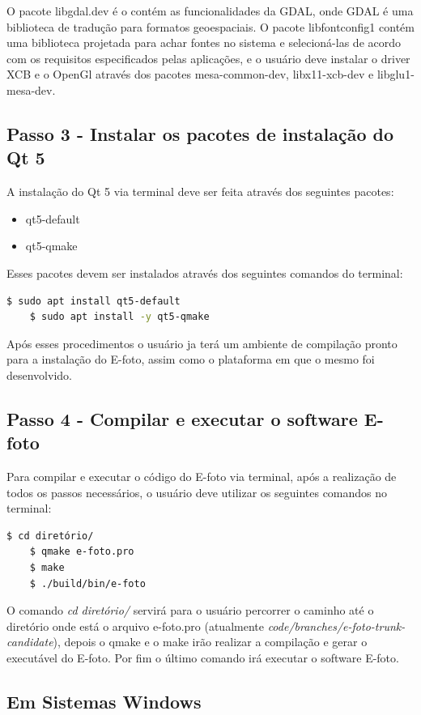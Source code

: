 O pacote libgdal.dev é o contém as funcionalidades da GDAL, onde GDAL é uma biblioteca de tradução para formatos geoespaciais. O pacote libfontconfig1 contém uma biblioteca projetada para achar fontes no sistema e selecioná-las de acordo com os requisitos especificados pelas aplicações, e o usuário deve instalar o driver XCB e o OpenGl através dos pacotes mesa-common-dev, libx11-xcb-dev e libglu1-mesa-dev. 
    
\subsection{Passo 3 - Instalar os pacotes de instalação do Qt 5}   
A instalação do Qt 5 via terminal deve ser feita através dos seguintes pacotes:
\begin{itemize}
	\item qt5-default
	\item qt5-qmake
\end{itemize}   
Esses pacotes devem ser instalados através dos seguintes comandos do terminal:
\begin{lstlisting}[language=bash]
	$ sudo apt install qt5-default
	$ sudo apt install -y qt5-qmake
\end{lstlisting}	
    
Após esses procedimentos o usuário ja terá um ambiente de compilação pronto para a instalação do E-foto, assim como o plataforma em que o mesmo foi desenvolvido.
    
\subsection{Passo 4 - Compilar e executar o software E-foto}
Para compilar e executar o código do E-foto via terminal, após a realização de todos os passos necessários, o usuário deve utilizar os seguintes comandos no terminal:
\begin{lstlisting}[language=bash]
   	$ cd diretório/
   	$ qmake e-foto.pro
   	$ make
   	$ ./build/bin/e-foto
\end{lstlisting}
   
O comando \textit{cd diretório/} servirá para o usuário percorrer o caminho até o diretório onde está o arquivo e-foto.pro (atualmente \textit{code/branches/e-foto-trunk-candidate}), depois o qmake e o make irão realizar a compilação e gerar o executável do E-foto. Por fim o último comando irá executar o software E-foto.

\subsection{Em Sistemas Windows}

